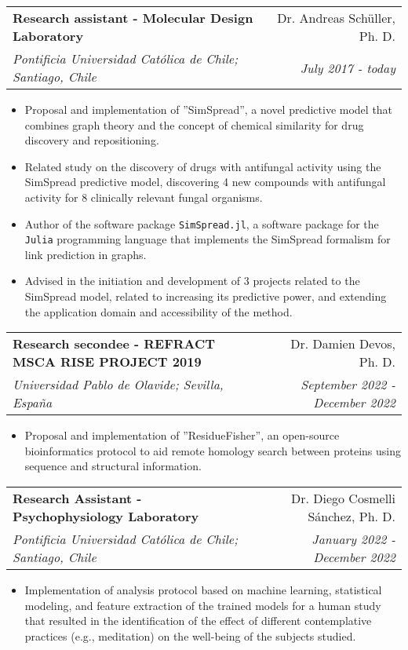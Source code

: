 \documentclass[letter,20pt]{article}
\makeatletter
\newcommand{\resumeSubheading}[4]{
  \vspace{-1pt}\item
    \begin{tabular*}{0.97\textwidth}{l@{\extracolsep{\fill}}r}
      \textbf{#1} & #2 \\
      \textit{#3} & \textit{#4} \\
    \end{tabular*}\vspace{-5pt}
}
\makeatother
\begin{document}
\resumeSubheading{Research assistant - Molecular Design Laboratory}{Dr. Andreas Schüller, Ph. D.}{Pontificia Universidad Católica de Chile; Santiago, Chile}{July 2017 - today}
\vspace{2pt}
\small{
	\begin{itemize}
		\item Proposal and implementation of ''SimSpread'', a novel predictive model that combines graph theory and the concept of chemical similarity for drug discovery and repositioning.
		\item Related study on the discovery of drugs with antifungal activity using the SimSpread predictive model, discovering 4 new compounds with antifungal activity for 8 clinically relevant fungal organisms.
		\item Author of the software package \texttt{SimSpread.jl}, a software package for the \texttt{Julia} programming language that implements the SimSpread formalism for link prediction in graphs.
		\item Advised in the initiation and development of 3 projects related to the SimSpread model, related to increasing its predictive power, and extending the application domain and accessibility of the method.
	\end{itemize}
}

\resumeSubheading{Research secondee - REFRACT MSCA RISE PROJECT 2019}{Dr. Damien Devos, Ph. D.}{Universidad Pablo de Olavide; Sevilla, España}{September 2022 - December 2022}
\vspace{2pt}
\begin{itemize}
	\item Proposal and implementation of ''ResidueFisher'', an open-source bioinformatics protocol to aid remote homology search between proteins using sequence and structural information.
\end{itemize}

\resumeSubheading{Research Assistant - Psychophysiology Laboratory}{Dr. Diego Cosmelli Sánchez, Ph. D.}{Pontificia Universidad Católica de Chile; Santiago, Chile}{January 2022 - December 2022}
\begin{itemize}
	\item Implementation of analysis protocol based on machine learning, statistical modeling, and feature extraction of the trained models for a human study that resulted in the identification of the effect of different contemplative practices (e.g., meditation) on the well-being of the subjects studied.
\end{itemize}
\end{document}
